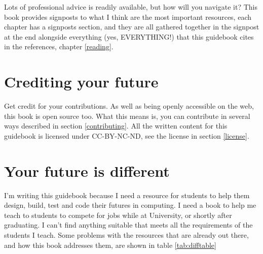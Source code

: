 \documentclass[
]{book}
\begin{document}
Lots of professional advice is readily available, but how will you navigate it? This book provides signposts to what I think are the most important resources, each chapter has a signposts section, and they are all gathered together in the signpost at the end alongside everything (yes, EVERYTHING!) that this guidebook cites in the references, chapter \ref{reading}.

\hypertarget{crediting}{%
\section{Crediting your future}\label{crediting}}

Get credit for your contributions. As well as being openly accessible on the web, this book is open source too. What this means is, you can contribute in several ways described in section \ref{contributing}. All the written content for this guidebook is licensed under CC-BY-NC-ND, see the license in section \ref{license}.

\hypertarget{thinkdifferent}{%
\section{Your future is different}\label{thinkdifferent}}

I'm writing this guidebook because I need a resource for students to help them design, build, test and code their futures in computing. I need a book to help me teach to students to compete for jobs while at University, or shortly after graduating. I can't find anything suitable that meets all the requirements of the students I teach. Some problems with the resources that are already out there, and how this book addresses them, are shown in table \ref{tab:difftable}
\end{document}
